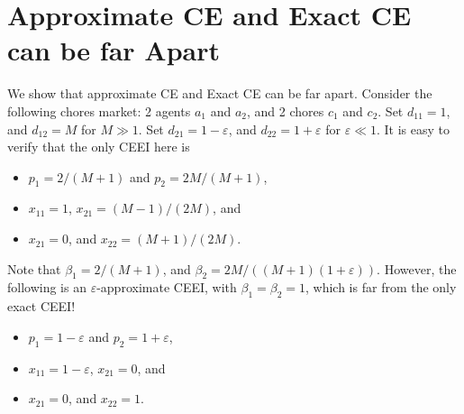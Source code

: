 \documentclass[format=acmsmall,authorversion]{acmart}
\begin{document}
\label{sec:polytime-conv-approxi} 


\section{Approximate CE and Exact CE can be far Apart}
\label{example-CE}
 We show that approximate CE and Exact CE can be far apart. Consider the following chores market: 2 agents $a_1$ and $a_2$, and 2 chores $c_1$ and $c_2$. Set $d_{11} = 1$, and $d_{12} = M$ for $M \gg 1$. Set $d_{21} = 1-\varepsilon$, and $d_{22} = 1 + \varepsilon$ for $\varepsilon \ll 1$. It is easy to verify that the only CEEI here is  
\begin{itemize}
    \item $p_1 = 2/(M+1)$ and $p_2 = 2M/(M+1)$,
    \item $x_{11} = 1$, $x_{21} = (M-1)/(2M)$, and 
    \item $x_{21} = 0$, and $x_{22} = (M+1)/(2M)$.
\end{itemize}

 Note that $\beta_1 = 2/(M+1)$, and $\beta_2 = 2M/((M+1)(1+\varepsilon))$. However, the following is an $\varepsilon$-approximate CEEI, with $\beta_1=\beta_2 = 1$, which is far from the only exact CEEI!

 \begin{itemize}
    \item $p_1 = 1-\varepsilon$ and $p_2 = 1+\varepsilon$,
    \item $x_{11} = 1-\varepsilon$, $x_{21} = 0$, and 
    \item $x_{21} = 0$, and $x_{22} = 1$.
\end{itemize}
\end{document}
